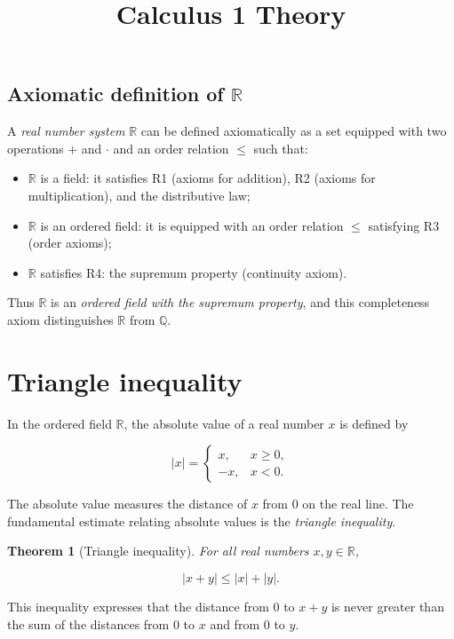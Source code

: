 \documentclass[11pt,a4paper]{article} \usepackage[T1]{fontenc}
\theoremstyle{plain} \newtheorem{theorem}{Theorem} \title{Calculus 1 Theory}
\begin{document}
\subsection*{Axiomatic definition of $\mathbb{R}$}

A \emph{real number system} $\mathbb{R}$ can be defined axiomatically as a set
equipped with two operations $+$ and $\cdot$ and an order relation $\le$ such
that:

\begin{itemize}
\item $\mathbb{R}$ is a field: it satisfies R1 (axioms for addition), R2
(axioms for multiplication), and the distributive law;
\item $\mathbb{R}$ is an ordered field: it is equipped with an order relation
$\le$ satisfying R3 (order axioms);
\item $\mathbb{R}$ satisfies R4: the supremum property (continuity axiom).
\end{itemize}

Thus $\mathbb{R}$ is an \emph{ordered field with the supremum property}, and
this completeness axiom distinguishes $\mathbb{R}$ from $\mathbb{Q}$.

\section{Triangle inequality}

In the ordered field $\mathbb{R}$, the absolute value of a real number $x$ is
defined by

\[
|x| =

\begin{cases}
x, & x\ge 0,\\ -x, & x<0.
\end{cases}

\]

The absolute value measures the distance of $x$ from $0$ on the real line. The
fundamental estimate relating absolute values is the \emph{triangle
inequality}.

\begin{theorem}
[Triangle inequality] For all real numbers $x,y\in\mathbb{R}$,

\[
|x+y| \le |x| + |y|.
\]

\end{theorem}

This inequality expresses that the distance from $0$ to $x+y$ is never greater
than the sum of the distances from $0$ to $x$ and from $0$ to $y$.
\end{document}
